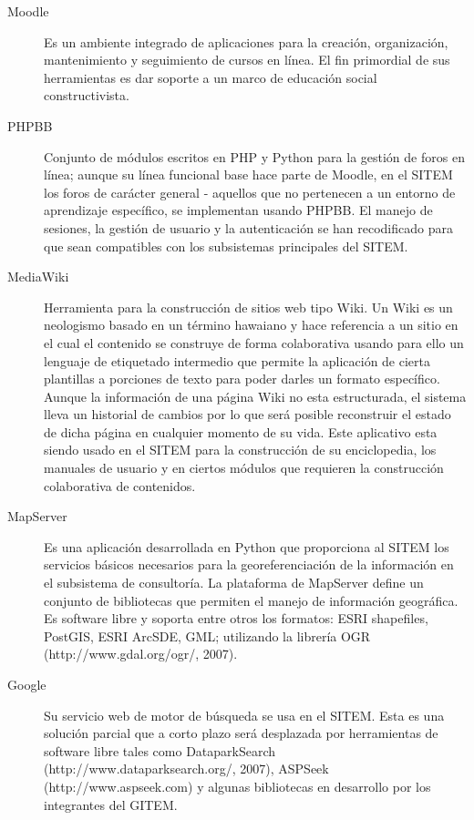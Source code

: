 \begin{description}
 \item[Moodle] Es un ambiente integrado de aplicaciones para la creación, organización, mantenimiento y seguimiento de cursos en línea. El fin primordial de sus herramientas es dar soporte a un marco de educación social constructivista.

\item[PHPBB] Conjunto de módulos escritos en PHP y Python para la gestión de foros en línea; aunque su línea funcional base hace parte de Moodle, en el SITEM los foros de carácter general - aquellos que no pertenecen a un entorno de aprendizaje específico, se implementan usando PHPBB. El manejo de sesiones, la gestión de usuario y la autenticación se han recodificado para que sean compatibles con los subsistemas principales del SITEM.

\item[MediaWiki] Herramienta para la construcción de sitios web tipo Wiki. Un Wiki es un neologismo basado en un término hawaiano y hace referencia a un sitio en el cual el contenido se construye de forma colaborativa usando para ello un lenguaje de etiquetado intermedio que permite la aplicación de cierta plantillas a porciones de texto para poder darles un formato específico. Aunque la información de una página Wiki no esta estructurada, el sistema lleva un historial de cambios por lo que será posible reconstruir el estado de dicha página en cualquier momento de su vida. Este aplicativo esta siendo usado en el SITEM para la construcción de su enciclopedia, los manuales de usuario y en ciertos módulos que requieren la construcción colaborativa de contenidos.

\item[MapServer] Es una aplicación desarrollada en Python que proporciona al SITEM los servicios básicos necesarios para la georeferenciación de la información en el subsistema de consultoría. La plataforma de MapServer define un conjunto de bibliotecas que permiten el manejo de información geográfica. Es software libre y soporta entre otros los formatos: ESRI shapefiles, PostGIS, ESRI ArcSDE, GML; utilizando la librería OGR (http://www.gdal.org/ogr/, 2007).

\item[Google] Su servicio web de motor de búsqueda se usa en el SITEM. Esta es una solución parcial que a corto plazo será desplazada por herramientas de software libre tales como DataparkSearch (http://www.dataparksearch.org/, 2007), ASPSeek (http://www.aspseek.com) y algunas bibliotecas en desarrollo por los integrantes del GITEM.


\end{description}
